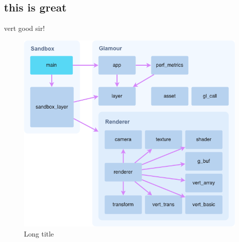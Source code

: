 \subsection{this is great}
vert good sir!

\begin{figure}\centering
  \includegraphics[width=1\columnwidth]{module-graph.png}
  \caption[Short title]{Long title}\label{fig:ff}
\end{figure}


